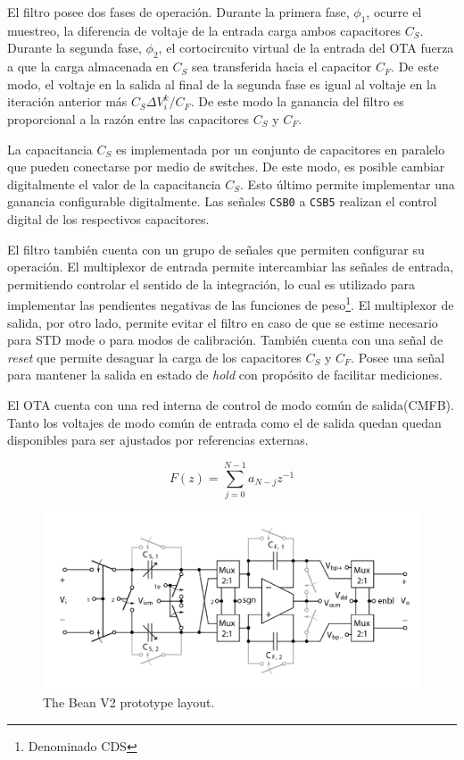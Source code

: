 El filtro posee dos fases de operación. Durante la primera fase, $\phi_1$, ocurre el muestreo,  la diferencia de voltaje de la entrada  carga ambos capacitores $C_S$. Durante la segunda fase, $\phi_2$, el cortocircuito virtual de la entrada del OTA fuerza a que la carga almacenada en $C_S$ sea transferida hacia el capacitor $C_F$. De este modo, el voltaje en la salida al final de la segunda fase es igual al voltaje en la iteración anterior más $C_S \Delta V_i^k / C_F$. De este modo la ganancia del filtro es proporcional a la razón entre las capacitores $C_S$ y $C_F$.
 
La capacitancia $C_S$ es implementada por un conjunto de capacitores en paralelo que pueden conectarse por medio de switches. De este modo, es posible cambiar digitalmente el valor de la capacitancia $C_S$. Esto último permite implementar una ganancia configurable digitalmente. Las señales \verb+CSB0+ a \verb+CSB5+ realizan el control digital de los respectivos capacitores.

El filtro también cuenta con un grupo de señales que permiten configurar su operación. El multiplexor de entrada permite intercambiar las señales de entrada, permitiendo controlar el sentido de la integración, lo cual es utilizado para implementar las pendientes negativas de las funciones de peso\footnote{Denominado CDS}. El multiplexor de salida, por otro lado, permite evitar el filtro en caso de que se estime necesario para STD mode o para modos de calibración. También cuenta con una señal de \textit{reset} que permite desaguar la carga de los capacitores $C_S$ y $C_F$. Posee una señal para mantener la salida en estado de \textit{hold} con propósito de facilitar mediciones. 

El OTA cuenta con una red interna de control de modo común de salida(CMFB). Tanto los voltajes de modo común de entrada como el de salida quedan quedan disponibles para ser ajustados por referencias externas. 
 



\begin{equation}
F(z)= \sum_{j=0}^{N-1} a_{N-j}z^{-1}
\label{theorical:ecuacion_f_z}
\end{equation}

\begin{figure}[!h]
	\centering
	\includegraphics[width=1\textwidth]{./figures/theorical/filtro.png}
	\caption{\label{theorical:filtro}The Bean V2 prototype layout.}
\end{figure}

